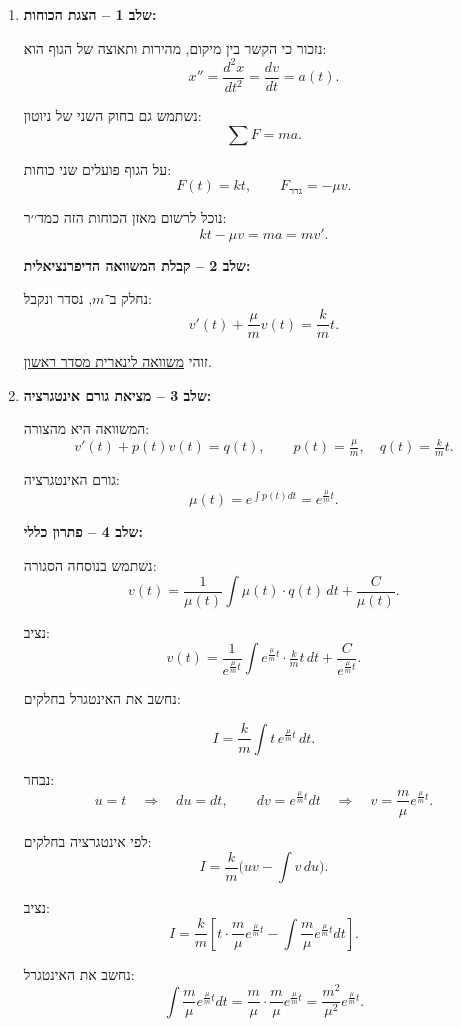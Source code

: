 \documentclass{article}
\numberwithin{equation}{section}
\begin{document}
\begin{enumerate}[label=(\alph*)]

\item
\textbf{שלב 1 – הצגת הכוחות:}  

נזכור כי הקשר בין מיקום, מהירות ותאוצה של הגוף הוא:
\[
x'' = \frac{d^2x}{dt^2} = \frac{dv}{dt} = a(t).
\]

נשתמש גם בחוק השני של ניוטון:  
\[
\sum F = ma.
\]

על הגוף פועלים שני כוחות:
\[
F(t) = kt, \qquad F_{\text{גרר}} = -\mu v.
\]

נוכל לרשום מאזן הכוחות הזה כמד׳׳ר:
\[
kt - \mu v = ma =  m v'.
\]

\textbf{שלב 2 – קבלת המשוואה הדיפרנציאלית:}  

נחלק ב־$m$, נסדר ונקבל:
\[
v'(t) + \frac{\mu}{m} v(t) = \frac{k}{m}t.
\]

זוהי \underline{משוואה לינארית מסדר ראשון}. 

\item

\textbf{שלב 3 – מציאת גורם אינטגרציה:}  

המשוואה היא מהצורה:
\[
v'(t) + p(t) v(t) = q(t), \qquad p(t) = \tfrac{\mu}{m}, \quad q(t) = \tfrac{k}{m}t.
\]

גורם האינטגרציה:
\[
\mu(t) = e^{\int p(t) dt} = e^{\frac{\mu}{m} t}.
\]

\textbf{שלב 4 – פתרון כללי:}  

נשתמש בנוסחה הסגורה:
\[
v(t) = \frac{1}{\mu(t)} \int \mu(t) \cdot q(t) \, dt + \frac{C}{\mu(t)}.
\]

נציב:
\[
v(t) = \frac{1}{e^{\tfrac{\mu}{m} t}} \int e^{\tfrac{\mu}{m} t} \cdot \tfrac{k}{m}t \, dt + \frac{C}{e^{\tfrac{\mu}{m} t}}.
\]

נחשב את האינטגרל בחלקים:

\[
I = \frac{k}{m} \int t \, e^{\tfrac{\mu}{m}t}\, dt.
\]

נבחר:
\[
u = t \quad \Rightarrow \quad du = dt, 
\qquad
dv = e^{\tfrac{\mu}{m}t} dt \quad \Rightarrow \quad v = \frac{m}{\mu} e^{\tfrac{\mu}{m}t}.
\]

לפי אינטגרציה בחלקים:
\[
I = \frac{k}{m}\Big( u v - \int v\, du \Big).
\]

נציב:
\[
I = \frac{k}{m}\left[ t \cdot \frac{m}{\mu} e^{\tfrac{\mu}{m}t} - \int \frac{m}{\mu} e^{\tfrac{\mu}{m}t} dt \right].
\]

נחשב את האינטגרל:
\[
\int \frac{m}{\mu} e^{\tfrac{\mu}{m}t} dt 
= \frac{m}{\mu} \cdot \frac{m}{\mu} e^{\tfrac{\mu}{m}t} 
= \frac{m^2}{\mu^2} e^{\tfrac{\mu}{m}t}.
\]


\end{enumerate}
\end{document}
